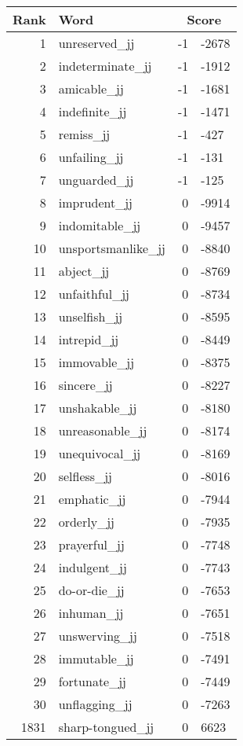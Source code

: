 \begin{longtable}[!htbp]{| rlr@{.}l |}
    \hline
    \textbf{Rank} & \textbf{Word} & \multicolumn{2}{c|}{\textbf{Score}} \\
    \hline
    \endhead
    1 & unreserved\_jj & -1 & -2678 \\
    2 & indeterminate\_jj & -1 & -1912 \\
    3 & amicable\_jj & -1 & -1681 \\
    4 & indefinite\_jj & -1 & -1471 \\
    5 & remiss\_jj & -1 & -427 \\
    6 & unfailing\_jj & -1 & -131 \\
    7 & unguarded\_jj & -1 & -125 \\
    8 & imprudent\_jj & 0 & -9914 \\
    9 & indomitable\_jj & 0 & -9457 \\
    10 & unsportsmanlike\_jj & 0 & -8840 \\
    11 & abject\_jj & 0 & -8769 \\
    12 & unfaithful\_jj & 0 & -8734 \\
    13 & unselfish\_jj & 0 & -8595 \\
    14 & intrepid\_jj & 0 & -8449 \\
    15 & immovable\_jj & 0 & -8375 \\
    16 & sincere\_jj & 0 & -8227 \\
    17 & unshakable\_jj & 0 & -8180 \\
    18 & unreasonable\_jj & 0 & -8174 \\
    19 & unequivocal\_jj & 0 & -8169 \\
    20 & selfless\_jj & 0 & -8016 \\
    21 & emphatic\_jj & 0 & -7944 \\
    22 & orderly\_jj & 0 & -7935 \\
    23 & prayerful\_jj & 0 & -7748 \\
    24 & indulgent\_jj & 0 & -7743 \\
    25 & do-or-die\_jj & 0 & -7653 \\
    26 & inhuman\_jj & 0 & -7651 \\
    27 & unswerving\_jj & 0 & -7518 \\
    28 & immutable\_jj & 0 & -7491 \\
    29 & fortunate\_jj & 0 & -7449 \\
    30 & unflagging\_jj & 0 & -7263 \\
    1831 & sharp-tongued\_jj & 0 & 6623 \\

\end{longtable}
